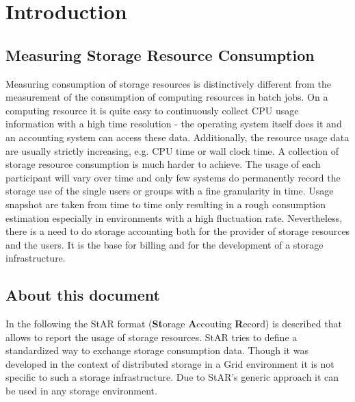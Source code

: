 \section{Introduction}

\subsection{Measuring Storage Resource Consumption}

Measuring consumption of storage resources is distinctively different from
the measurement of the consumption of computing resources in batch jobs. 
On a computing resource it is quite easy to continuously collect CPU 
usage information with a high time resolution - the operating system itself does 
it and an accounting system can access these data. Additionally,
the resource usage data are usually strictly increasing, e.g. 
CPU time or wall clock time.
A collection of storage resource consumption is much harder
to achieve. The usage of each participant will vary over time and only few 
systems do permanently record the storage use of the single users or 
groups with a fine granularity in time. 
Usage snapshot are taken from time to time only
resulting in a rough consumption estimation especially in environments
with a high fluctuation rate. 
Nevertheless, there is a need to do storage accounting both for the provider
of storage resources and the users. It is the base for billing and for 
the development of a storage infrastructure.



\subsection{About this document}
In the following the StAR format 
(\textbf{St}orage \textbf{A}ccouting \textbf{R}ecord) is described 
that allows to report the usage of 
storage resources. StAR tries to define a standardized way to exchange storage
consumption data. Though it was developed in the context of distributed storage
in a Grid environment it is not specific to such a storage infrastructure.
Due to StAR's generic approach it can be used in any storage environment.


